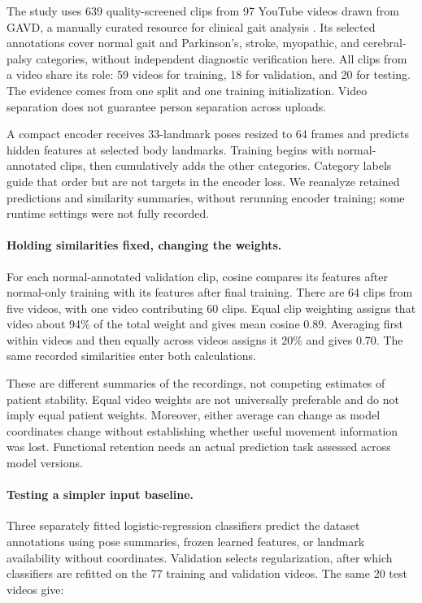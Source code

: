 \documentclass{article}
\begin{document}
The study uses 639 quality-screened clips from 97 YouTube videos drawn from GAVD, a manually curated resource for clinical gait analysis \citep{ranjan2025gavd}. Its selected annotations cover normal gait and Parkinson's, stroke, myopathic, and cerebral-palsy categories, without independent diagnostic verification here. All clips from a video share its role: 59 videos for training, 18 for validation, and 20 for testing. The evidence comes from one split and one training initialization. Video separation does not guarantee person separation across uploads.

A compact encoder receives 33-landmark poses resized to 64 frames and predicts hidden features at selected body landmarks. Training begins with normal-annotated clips, then cumulatively adds the other categories. Category labels guide that order but are not targets in the encoder loss. We reanalyze retained predictions and similarity summaries, without rerunning encoder training; some runtime settings were not fully recorded.

\paragraph{Holding similarities fixed, changing the weights.}
For each normal-annotated validation clip, cosine compares its features after normal-only training with its features after final training. There are 64 clips from five videos, with one video contributing 60 clips. Equal clip weighting assigns that video about 94\% of the total weight and gives mean cosine 0.89. Averaging first within videos and then equally across videos assigns it 20\% and gives 0.70. The same recorded similarities enter both calculations.

These are different summaries of the recordings, not competing estimates of patient stability. Equal video weights are not universally preferable and do not imply equal patient weights. Moreover, either average can change as model coordinates change without establishing whether useful movement information was lost. Functional retention needs an actual prediction task assessed across model versions.

\paragraph{Testing a simpler input baseline.}
Three separately fitted logistic-regression classifiers predict the dataset annotations using pose summaries, frozen learned features, or landmark availability without coordinates. Validation selects regularization, after which classifiers are refitted on the 77 training and validation videos. The same 20 test videos give:
\end{document}
